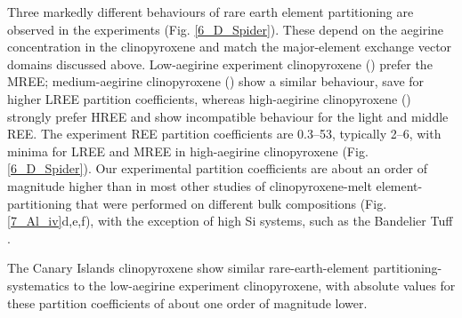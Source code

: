 \documentclass[review,authoryear,12pt]{elsarticle}
\begin{document}
 Three markedly different behaviours of rare earth element partitioning are observed in the experiments (Fig. \ref{6_D_Spider}). These depend on the aegirine concentration in the clinopyroxene and match the major-element exchange vector domains discussed above. Low-aegirine experiment clinopyroxene () prefer the MREE; medium-aegirine clinopyroxene () show a similar behaviour, save for higher LREE partition coefficients, whereas high-aegirine clinopyroxene () strongly prefer HREE and show incompatible behaviour for the light and middle REE. The experiment REE partition coefficients are 0.3--53, typically 2--6, with minima for LREE and MREE in high-aegirine clinopyroxene (Fig. \ref{6_D_Spider}). Our experimental partition coefficients are about an order of magnitude higher than in most other studies of clinopyroxene-melt element-partitioning that were performed on different bulk compositions (Fig. \ref{7_Al_iv}d,e,f), with the exception of high Si systems, such as the Bandelier Tuff \citep[cf.][]{Olin2010}.

  The Canary Islands clinopyroxene show similar rare-earth-element partitioning-systematics to the low-aegirine experiment clinopyroxene, with absolute values for these partition coefficients of about one order of magnitude lower.
\end{document}
